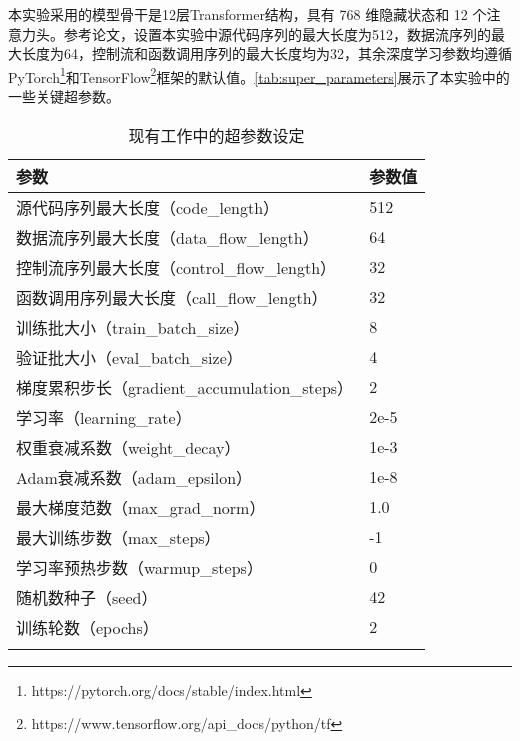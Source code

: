 本实验采用的模型骨干是12层Transformer结构，具有 768 维隐藏状态和 12 个注意力头。参考论文\cite{guo2020graphcodebert}，设置本实验中源代码序列的最大长度为512，数据流序列的最大长度为64，控制流和函数调用序列的最大长度均为32，其余深度学习参数均遵循PyTorch\footnote{https://pytorch.org/docs/stable/index.html}和TensorFlow\footnote{https://www.tensorflow.org/api\_docs/python/tf}框架的默认值。\autoref{tab:super_parameters}展示了本实验中的一些关键超参数。
\begin{table}[htbp]
    \caption{\label{tab:super_parameters}现有工作中的超参数设定}
    \small
    \renewcommand{\arraystretch}{1.5}
    \begin{tabularx}{\linewidth}{p{8cm}<{\centering}X<{\centering}}
        \Xhline{2\arrayrulewidth}
        参数                            & 参数值  \\ \hline
        源代码序列最大长度（code\_length）                  & 512  \\
        数据流序列最大长度（data\_flow\_length）            & 64   \\
        控制流序列最大长度（control\_flow\_length）            & 32   \\
        函数调用序列最大长度（call\_flow\_length）            & 32   \\
        训练批大小（train\_batch\_size）            & 8    \\
        验证批大小（eval\_batch\_size）             & 4    \\
        梯度累积步长（gradient\_accumulation\_steps） & 2    \\
        学习率（learning\_rate）                & 2e-5 \\
        权重衰减系数（weight\_decay）                 & 1e-3  \\
        Adam衰减系数（adam\_epsilon）                 & 1e-8 \\
        最大梯度范数（max\_grad\_norm）               & 1.0  \\
        最大训练步数（max\_steps）                    & -1   \\
        学习率预热步数（warmup\_steps）                 & 0    \\
        随机数种子（seed）                          & 42   \\
        训练轮数（epochs）                        & 2    \\ \Xhline{2\arrayrulewidth}
        \end{tabularx}
\end{table}



